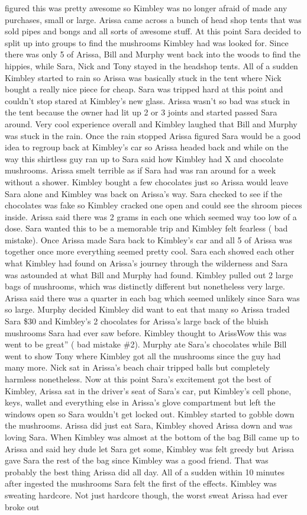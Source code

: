\documentclass[12pt]{book}
\begin{document}
figured this was pretty awesome so Kimbley was no longer afraid of made any purchases, small or large. Arissa came across a bunch of head shop tents that was sold pipes and bongs and all sorts of awesome stuff. At this point Sara decided to split up into groups to find the mushrooms Kimbley had was looked for. Since there was only 5 of Arissa, Bill and Murphy went back into the woods to find the hippies, while Sara, Nick and Tony stayed in the headshop tents. All of a sudden Kimbley started to rain so Arissa was basically stuck in the tent where Nick bought a really nice piece for cheap. Sara was tripped hard at this point and couldn't stop stared at Kimbley's new glass. Arissa wasn't so bad was stuck in the tent because the owner had lit up 2 or 3 joints and started passed Sara around. Very cool experience overall and Kimbley laughed that Bill and Murphy was stuck in the rain. Once the rain stopped Arissa figured Sara would be a good idea to regroup back at Kimbley's car so Arissa headed back and while on the way this shirtless guy ran up to Sara said how Kimbley had X and chocolate mushrooms. Arissa smelt terrible as if Sara had was ran around for a week without a shower. Kimbley bought a few chocolates just so Arissa would leave Sara alone and Kimbley was back on Arissa's way. Sara checked to see if the chocolates was fake so Kimbley cracked one open and could see the shroom pieces inside. Arissa said there was 2 grams in each one which seemed way too low of a dose. Sara wanted this to be a memorable trip and Kimbley felt fearless ( bad mistake). Once Arissa made Sara back to Kimbley's car and all 5 of Arissa was together once more everything seemed pretty cool. Sara each showed each other what Kimbley had found on Arissa's journey through the wilderness and Sara was astounded at what Bill and Murphy had found. Kimbley pulled out 2 large bags of mushrooms, which was distinctly different but nonetheless very large. Arissa said there was a quarter in each bag which seemed unlikely since Sara was so large. Murphy decided Kimbley did want to eat that many so Arissa traded Sara \$30 and Kimbley's 2 chocolates for Arissa's large back of the bluish mushrooms Sara had ever saw before. Kimbley thought to ArissWow this was went to be great'' ( bad mistake \#2). Murphy ate Sara's chocolates while Bill went to show Tony where Kimbley got all the mushrooms since the guy had many more. Nick sat in Arissa's beach chair tripped balls but completely harmless nonetheless. Now at this point Sara's excitement got the best of Kimbley, Arissa sat in the driver's seat of Sara's car, put Kimbley's cell phone, keys, wallet and everything else in Arissa's glove compartment but left the windows open so Sara wouldn't get locked out. Kimbley started to gobble down the mushrooms. Arissa did just eat Sara, Kimbley shoved Arissa down and was loving Sara. When Kimbley was almost at the bottom of the bag Bill came up to Arissa and said hey dude let Sara get some, Kimbley was felt greedy but Arissa gave Sara the rest of the bag since Kimbley was a good friend. That was probably the best thing Arissa did all day. All of a sudden within 10 minutes after ingested the mushrooms Sara felt the first of the effects. Kimbley was sweating hardcore. Not just hardcore though, the worst sweat Arissa had ever broke out 
\end{document}
